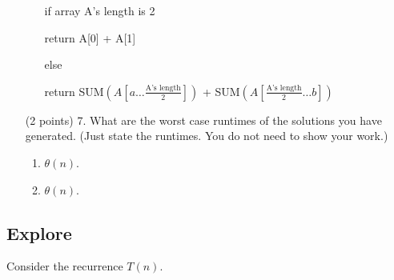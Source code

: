 \documentclass[paper=a4, fontsize=11pt]{scrartcl}
\numberwithin{equation}{section}		%
\numberwithin{figure}{section}			%
\numberwithin{table}{section}				%
\begin{document}
\begin{enumerate}
\begin{enumerate}
	\hspace{5ex} if array A's length is 2
	
	\hspace{9ex} return A[0] + A[1]
	
	\hspace{5ex} else
	
	\hspace{9ex} return SUM$(A[a\dots \frac{\text{A's length}}{2}])$ + SUM$(A[\frac{\text{A's length}}{2}\dots b])$
	
\end{enumerate}

\item [(2 points) 7.] What are the worst case runtimes of the solutions you have generated.  (Just state the runtimes.  You do not need to show your work.)
\begin{enumerate}
	\item $\theta(n)$.
	
	\item $\theta(n)$.
\end{enumerate}

\end{enumerate}

\newpage

\subsection{Explore}

Consider the recurrence $T(n)$.  
\end{document}
